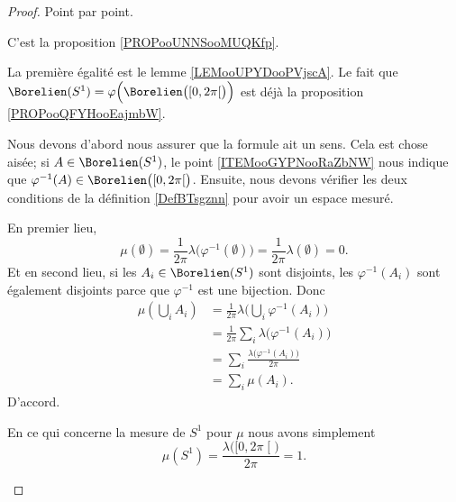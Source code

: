 \begin{proof}
	Point par point.
	\begin{subproof}
		C'est la proposition \ref{PROPooUNNSooMUQKfp}.

		La première égalité est le lemme \ref{LEMooUPYDooPVjscA}. Le fait que \( \Borelien(S^1)=\varphi\Big( \Borelien\big( \mathopen[ 0 , 2\pi \mathclose[ \big) \Big)\) est déjà la proposition \ref{PROPooQFYHooEajmbW}.

		Nous devons d'abord nous assurer que la formule ait un sens. Cela est chose aisée; si \( A\in \Borelien(S^1)\), le point \ref{ITEMooGYPNooRaZbNW} nous indique que \( \varphi^{-1}(A)\in \Borelien\big( \mathopen[ 0 , 2\pi \mathclose[ \big)\). Ensuite, nous devons vérifier les deux conditions de la définition \ref{DefBTsgznn} pour avoir un espace mesuré.

		En premier lieu,
		\begin{equation}
			\mu(\emptyset)=\frac{1}{ 2\pi }\lambda\big( \varphi^{-1}(\emptyset) \big)=\frac{1}{ 2\pi }\lambda(\emptyset)=0.
		\end{equation}
		Et en second lieu, si les \( A_i\in \Borelien(S^1)\) sont disjoints, les \( \varphi^{-1}(A_i)\) sont également disjoints parce que \( \varphi^{-1}\) est une bijection. Donc
		\begin{subequations}
			\begin{align}
				\mu(\bigcup_iA_i) & =\frac{1}{ 2\pi }\lambda\big( \bigcup_i\varphi^{-1}(A_i) \big) \\
				                  & =\frac{1}{ 2\pi }\sum_i\lambda\big( \varphi^{-1}(A_i) \big)    \\
				                  & =\sum_i\frac{ \lambda\big( \varphi^{-1}(A_i) \big) }{ 2\pi }   \\
				                  & =\sum_i\mu(A_i).
			\end{align}
		\end{subequations}
		D'accord.

		En ce qui concerne la mesure de \( S^1\) pour \(\mu\) nous avons simplement
		\begin{equation}
			\mu(S^1)=\frac{ \lambda\big( \mathopen[ 0 , 2\pi \mathclose[ \big) }{ 2\pi }=1.
		\end{equation}
	\end{subproof}
\end{proof}

